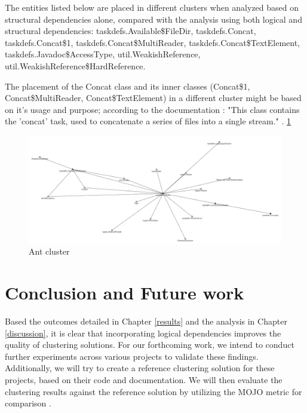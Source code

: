 \documentclass[conference]{IEEEtran}
\begin{document}
The entities listed below are placed in different clusters when analyzed based on structural dependencies alone, compared with the analysis using both logical and structural dependencies: taskdefs.Available\$FileDir, taskdefs.Concat, taskdefs.Concat\$1, taskdefs.Concat\$MultiReader, taskdefs.Concat\$TextElement, taskdefs.Javadoc\$AccessType, util.WeakishReference, util.WeakishReference\$HardReference.

The placement of the Concat class and its inner classes (Concat\$1, Concat\$MultiReader, Concat\$TextElement) in a different cluster might be based on it's usage and purpose; according to the documentation : "This class contains the 'concat' task, used to concatenate a series of files into a single stream." \cite{ant_concat}. \ref{fig:cluster1}

\begin{figure}
\centering
\includegraphics[width=\columnwidth]{cluster1.png}
\caption{Ant cluster}
\label{fig:cluster1}
\centering
\end{figure}

\section{Conclusion and Future work}

Based the outcomes detailed in Chapter \ref{results} and the analysis in Chapter \ref{discussion}, it is clear that incorporating logical dependencies improves the quality of clustering solutions. For our forthcoming work, we intend to conduct further experiments across various projects to validate these findings. Additionally, we will try to create a reference clustering solution for these projects, based on their code and documentation. We will then evaluate the clustering results against the reference solution by utilizing the MOJO metric for comparison \cite{mojo-tzerpos}.




\end{document}
